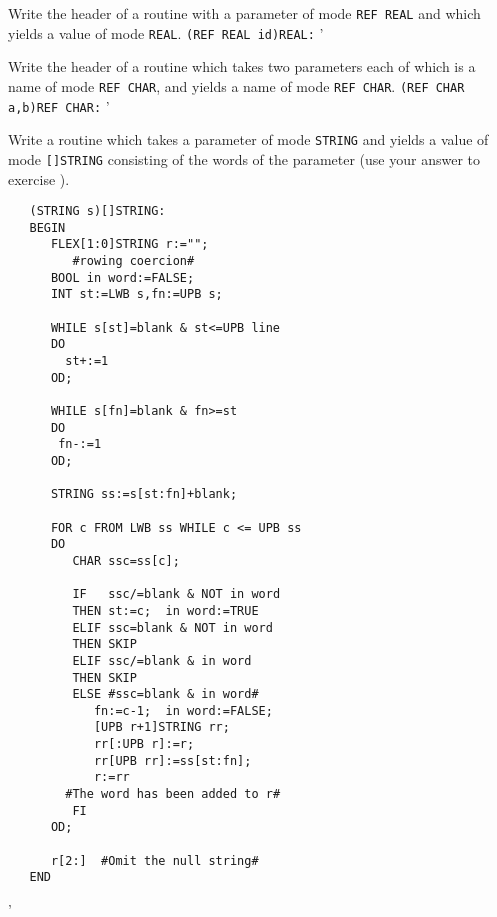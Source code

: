 \begin{exercise}
\item Write the header of a routine with a parameter of mode
\verb|REF REAL| and which yields a value of mode \verb|REAL|.
\ans \verb|(REF REAL id)REAL:|
'
\item Write the header of a routine which takes two parameters each of
which is a name of mode \verb|REF CHAR|, and yields a name of mode
\verb|REF CHAR|. \ans \verb|(REF CHAR a,b)REF CHAR:|
'
\item Write a routine which takes a parameter of mode \verb|STRING| and
yields a value of mode \verb|[]STRING| consisting of the words of the
parameter (use your answer to exercise ).
\ans \ %
\begin{verbatim}
   (STRING s)[]STRING:
   BEGIN
      FLEX[1:0]STRING r:="";
         #rowing coercion#
      BOOL in word:=FALSE;
      INT st:=LWB s,fn:=UPB s;

      WHILE s[st]=blank & st<=UPB line
      DO
        st+:=1
      OD;

      WHILE s[fn]=blank & fn>=st
      DO
       fn-:=1
      OD;

      STRING ss:=s[st:fn]+blank;

      FOR c FROM LWB ss WHILE c <= UPB ss
      DO
         CHAR ssc=ss[c];

         IF   ssc/=blank & NOT in word
         THEN st:=c;  in word:=TRUE
         ELIF ssc=blank & NOT in word
         THEN SKIP
         ELIF ssc/=blank & in word
         THEN SKIP
         ELSE #ssc=blank & in word#
            fn:=c-1;  in word:=FALSE;
            [UPB r+1]STRING rr;
            rr[:UPB r]:=r;
            rr[UPB rr]:=ss[st:fn];
            r:=rr
        #The word has been added to r#
         FI
      OD;

      r[2:]  #Omit the null string#
   END
\end{verbatim}
'
\end{exercise}


